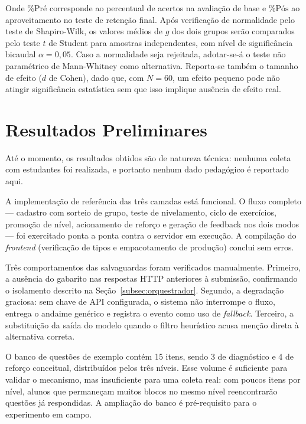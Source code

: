 \documentclass[10pt, a4paper, twocolumn]{article}
\begin{document}
Onde $\text{\% Pré}$ corresponde ao percentual de acertos na avaliação de base e
$\text{\% Pós}$ ao aproveitamento no teste de retenção final. Após verificação de
normalidade pelo teste de Shapiro-Wilk, os valores médios de $g$ dos dois grupos
serão comparados pelo teste $t$ de Student para amostras independentes, com nível
de significância bicaudal $\alpha = 0{,}05$. Caso a normalidade seja rejeitada,
adotar-se-á o teste não paramétrico de Mann-Whitney como alternativa. Reporta-se
também o tamanho de efeito ($d$ de Cohen), dado que, com $N = 60$, um efeito
pequeno pode não atingir significância estatística sem que isso implique
ausência de efeito real.

\section{Resultados Preliminares}
\label{sec:resultados}

Até o momento, os resultados obtidos são de natureza técnica: nenhuma coleta com
estudantes foi realizada, e portanto nenhum dado pedagógico é reportado aqui.

A implementação de referência das três camadas está funcional. O fluxo completo
--- cadastro com sorteio de grupo, teste de nivelamento, ciclo de exercícios,
promoção de nível, acionamento de reforço e geração de feedback nos dois modos
--- foi exercitado ponta a ponta contra o servidor em execução. A compilação do
\textit{frontend} (verificação de tipos e empacotamento de produção) conclui sem
erros.

Três comportamentos das salvaguardas foram verificados manualmente. Primeiro, a
ausência do gabarito nas respostas HTTP anteriores à submissão, confirmando o
isolamento descrito na Seção~\ref{subsec:orquestrador}. Segundo, a degradação
graciosa: sem chave de API configurada, o sistema não interrompe o fluxo, entrega
o andaime genérico e registra o evento como uso de \textit{fallback}. Terceiro, a
substituição da saída do modelo quando o filtro heurístico acusa menção direta à
alternativa correta.

O banco de questões de exemplo contém 15 itens, sendo 3 de diagnóstico e 4 de
reforço conceitual, distribuídos pelos três níveis. Esse volume é suficiente para
validar o mecanismo, mas insuficiente para uma coleta real: com poucos itens por
nível, alunos que permaneçam muitos blocos no mesmo nível reencontrarão questões
já respondidas. A ampliação do banco é pré-requisito para o experimento em campo.
\end{document}
